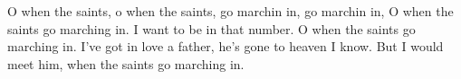 \beginverse*
O when the saints, o when the saints,
go marchin in, go marchin in,
O when the saints go marching in.
I want to be in that number.
O when the saints go marching in.
\endverse
\beginchorus
I’ve got in love a father,
he’s gone to heaven I know.
But I would meet him,
when the saints go marching in.
\endchorus
\endsong 